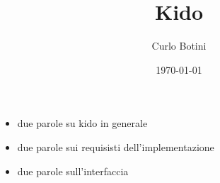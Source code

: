 \documentclass[12pt,italian]{article}
\title{Kido}
\author[1]{Curlo Botini}
\affil[1]{Univorsita Bucocca}
\date{\today}
\begin{document}
\maketitle

\begin{itemize}
  \item due parole su kido in generale
  \item due parole sui requisisti dell'implementazione
  \item due parole sull'interfaccia
\end{itemize}







{}


\end{document}
